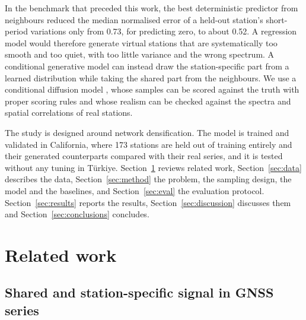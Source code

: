 \documentclass[preprint,12pt,authoryear]{elsarticle}
\begin{document}
In the benchmark that preceded this work, the best deterministic predictor from
neighbours reduced the median normalised error of a held-out station's short-period
variations only from 0.73, for predicting zero, to about 0.52. A regression model would
therefore generate virtual stations that are systematically too smooth and too quiet,
with too little variance and the wrong spectrum. A conditional generative model can
instead draw the station-specific part from a learned distribution while taking the
shared part from the neighbours. We use a conditional diffusion model
\citep{ho2020ddpm,karras2022edm}, whose samples can be scored against the truth with
proper scoring rules \citep{gneiting2007} and whose realism can be checked against the
spectra and spatial correlations of real stations.

The study is designed around network densification. The model is trained and validated in
California, where 173 stations are held out of training entirely and their generated
counterparts compared with their real series, and it is tested without any tuning in
T\"urkiye. Section~\ref{sec:related} reviews related work, Section~\ref{sec:data}
describes the data, Section~\ref{sec:method} the problem, the sampling design, the model
and the baselines, and Section~\ref{sec:eval} the evaluation protocol.
Section~\ref{sec:results} reports the results, Section~\ref{sec:discussion} discusses
them and Section~\ref{sec:conclusions} concludes.

\section{Related work}
\label{sec:related}

\subsection{Shared and station-specific signal in GNSS series}
\end{document}
